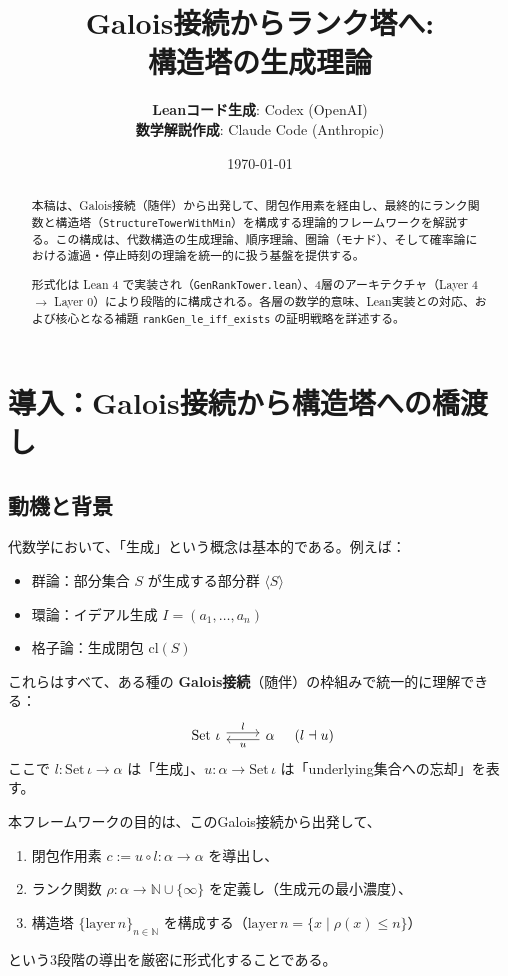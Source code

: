 \documentclass[a4paper,12pt]{ltjsarticle}
\title{Galois接続からランク塔へ:\\構造塔の生成理論}
\author{
  \textbf{Leanコード生成}: Codex (OpenAI) \\
  \textbf{数学解説作成}: Claude Code (Anthropic)
}
\date{\today}
\newcommand{\N}{\mathbb{N}}
\newcommand{\Lean}[1]{\texttt{\color{blue}#1}}
\begin{document}
\maketitle

\begin{abstract}
本稿は、Galois接続（随伴）から出発して、閉包作用素を経由し、最終的にランク関数と構造塔（\texttt{StructureTowerWithMin}）を構成する理論的フレームワークを解説する。この構成は、代数構造の生成理論、順序理論、圏論（モナド）、そして確率論における濾過・停止時刻の理論を統一的に扱う基盤を提供する。

形式化は Lean 4 で実装され（\Lean{GenRankTower.lean}）、4層のアーキテクチャ（Layer 4 $\to$ Layer 0）により段階的に構成される。各層の数学的意味、Lean実装との対応、および核心となる補題 \Lean{rankGen\_le\_iff\_exists} の証明戦略を詳述する。
\end{abstract}

\tableofcontents

\newpage

\section{導入：Galois接続から構造塔への橋渡し}

\subsection{動機と背景}

代数学において、「生成」という概念は基本的である。例えば：
\begin{itemize}
  \item 群論：部分集合 $S$ が生成する部分群 $\langle S \rangle$
  \item 環論：イデアル生成 $I = (a_1, \ldots, a_n)$
  \item 格子論：生成閉包 $\mathrm{cl}(S)$
\end{itemize}

これらはすべて、ある種の \textbf{Galois接続}（随伴）の枠組みで統一的に理解できる：
\[
\begin{tikzcd}
  \text{Set } \iota \arrow[r, shift left, "l"] & \alpha \arrow[l, shift left, "u"]
\end{tikzcd}
\quad (l \dashv u)
\]
ここで $l : \mathrm{Set}\, \iota \to \alpha$ は「生成」、$u : \alpha \to \mathrm{Set}\, \iota$ は「underlying集合への忘却」を表す。

本フレームワークの目的は、このGalois接続から出発して、
\begin{enumerate}
  \item 閉包作用素 $c := u \circ l : \alpha \to \alpha$ を導出し、
  \item ランク関数 $\rho : \alpha \to \N \cup \{\infty\}$ を定義し（生成元の最小濃度）、
  \item 構造塔 $\{\text{layer}\, n\}_{n \in \N}$ を構成する（$\text{layer}\, n = \{x \mid \rho(x) \le n\}$）
\end{enumerate}
という3段階の導出を厳密に形式化することである。
\end{document}
